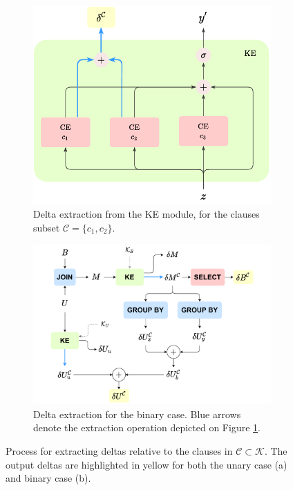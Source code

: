  \begin{figure}
 	\centering
 	\begin{subfigure}{.4\textwidth}
 		\centering
 		\includegraphics[width=\linewidth]{figures/deltas_extraction_unary.pdf}
 		\caption{Delta extraction from the KE module, for the clauses subset $\mathcal{C}=\{c_1,c_2\}$.}
 		\label{fig:delta_extraction_unary}	
 	\end{subfigure}%
  	\begin{subfigure}{.6\textwidth}
 	\centering
 	\includegraphics[width=\linewidth]{figures/delta_extractions.pdf}
 	\caption{Delta extraction for the binary case. Blue arrows denote the extraction operation depicted on Figure \ref{fig:delta_extraction_unary}.}
 	\label{fig:delta_extraction_binary}
 \end{subfigure}%
\caption{Process for extracting deltas relative to the clauses in $\mathcal{C \subset \mathcal{K}}$. The output deltas are highlighted in yellow for both the unary case (a) and binary case (b).}
\label{fig:delta_extraction}
 \end{figure}

